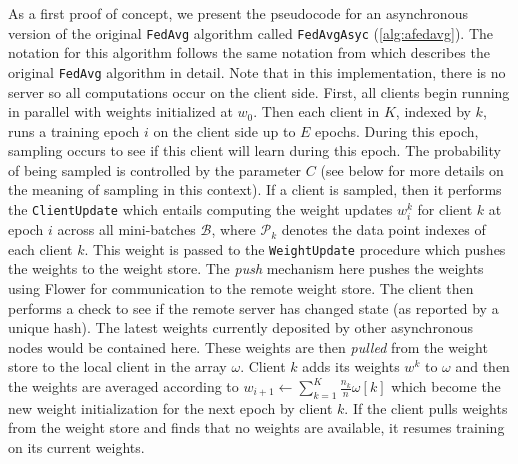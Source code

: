 \documentclass[twocolumn, switch]{article} %
\begin{document}
As a first proof of concept, we present the pseudocode for an asynchronous version of the original \texttt{FedAvg} algorithm called \texttt{FedAvgAsyc} (\autoref{alg:afedavg}). The notation for this algorithm follows the same notation from \cite{fed_2} which describes the original \texttt{FedAvg} algorithm in detail. Note that in this implementation, there is no server so all computations occur on the client side. First, all clients begin running in parallel with weights initialized at $w_0$. Then each client in $K$, indexed by $k$, runs a training epoch $i$ on the client side up to $E$ epochs. During this epoch, sampling occurs to see if this client will learn during this epoch. The probability of being sampled is controlled by the parameter $C$ (see below for more details on the meaning of sampling in this context). If a client is sampled, then it performs the \texttt{ClientUpdate} which entails computing the weight updates $w^k_i$ for client $k$ at epoch $i$ across all mini-batches $\mathcal{B}$, where $\mathcal{P}_k$ denotes the data point indexes of each client $k$. This weight is passed to the \texttt{WeightUpdate} procedure which pushes the weights to the weight store. The \textit{push} mechanism here pushes the weights using Flower for communication to the remote weight store. The client then performs a check to see if the remote server has changed state (as reported by a unique hash). The latest weights currently deposited by other asynchronous nodes would be contained here. These weights are then \textit{pulled} from the weight store to the local client in the array $\omega$. Client $k$ adds its weights $w^k$ to $\omega$ and then the weights are averaged according to $w_{i+1} \gets \sum_{k=1}^K \frac{n_k}{n} \omega[k]$ which become the new weight initialization for the next epoch by client $k$. If the client pulls weights from the weight store and finds that no weights are available, it resumes training on its current weights.
\end{document}
